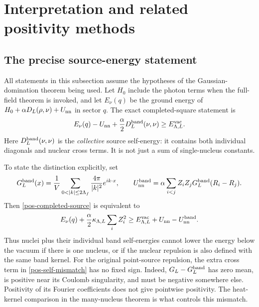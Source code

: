 \section{Interpretation and related positivity methods}
\label{pos-section}

\subsection{The precise source-energy statement}

All statements in this subsection assume the hypotheses of the
Gaussian-domination theorem being used.  Let $H_0$ include the photon
terms when the full-field theorem is invoked, and let $E_\nu(q)$ be the
ground energy of $H_0+\alpha D_L(\rho,\nu)+U_{\rm nn}$ in sector $q$.
The exact completed-square statement is
\begin{equation}
 E_\nu(q)-U_{\rm nn}
 +\frac\alpha2D_L^{\rm band}(\nu,\nu)
 \geq E^{\rm vac}_{\Lambda,L}.
 \label{pos-completed-source}
\end{equation}
Here $D_L^{\rm band}(\nu,\nu)$ is the \emph{collective} source
self-energy: it contains both individual diagonals and nuclear cross
terms.  It is not just a sum of single-nucleus constants.

To state the distinction explicitly, set
\[
 G_L^{\rm band}(x)=\frac1V\sum_{0<|k|\leq2\Lambda_f}
                \frac{4\pi}{|k|^2}e^{ik\cdot x},\qquad
 U_{\rm nn}^{\rm band}=\alpha\sum_{i<j}Z_iZ_j
                  G_L^{\rm band}(R_i-R_j).
\]
Then \eqref{pos-completed-source} is equivalent to
\begin{equation}
 E_\nu(q)+\frac\alpha2\kappa_{\Lambda,L}\sum_i Z_i^2
 \geq E^{\rm vac}_{\Lambda,L}
       +U_{\rm nn}-U_{\rm nn}^{\rm band}.
 \label{pos-self-mismatch}
\end{equation}
Thus nuclei plus their individual band self-energies cannot lower the
energy below the vacuum if there is one nucleus, or if the nuclear
repulsion is also defined with the same band kernel.  For the original
point-source repulsion, the extra cross term in
\eqref{pos-self-mismatch} has no fixed sign.  Indeed,
$G_L-G_L^{\rm band}$ has zero mean, is positive near its Coulomb
singularity, and must be negative somewhere else.  Positivity of its
Fourier coefficients does not give pointwise positivity.  The
heat-kernel comparison in the many-nucleus theorem is what controls
this mismatch.

